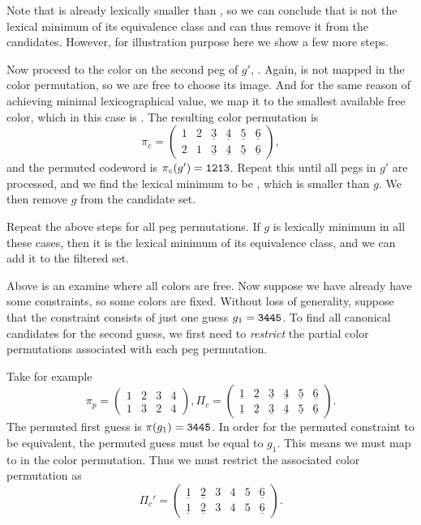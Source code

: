 Note that  is already lexically smaller than , so we can conclude that  is not the lexical minimum of its equivalence class and can thus remove it from the candidates. However, for illustration purpose here we show a few more steps.

Now proceed to the color on the second peg of $g'$, . Again,  is not mapped in the color permutation, so we are free to choose its image. And for the same reason of achieving minimal lexicographical value, we map it to the smallest available free color, which in this case is . The resulting color permutation is
\[
\pi_c = 
\begin{pmatrix}
1 & 2 & \underline{3} & \underline{4} & \underline{5} & \underline{6} \\
2 & 1 & \underline{3} & \underline{4} & \underline{5} & \underline{6} 
\end{pmatrix} ,
\]
and the permuted codeword is $\pi_c(g') = \texttt{1213}$. Repeat this until all pegs in $g'$ are processed, and we find the lexical minimum to be , which is smaller than $g$. We then remove $g$ from the candidate set. 

Repeat the above steps for all peg permutations. If $g$ is lexically minimum in all these cases, then it is the lexical minimum of its equivalence class, and we can add it to the filtered set.

Above is an examine where all colors are free. Now suppose we have already have some constraints, so some colors are fixed. Without loss of generality, suppose that the constraint consists of just one guess $g_1 = \texttt{3445}$. To find all canonical candidates for the second guess, we first need to \emph{restrict} the partial color permutations associated with each peg permutation. 

Take for example 
\[
\pi_p = 
\begin{pmatrix}
1 & 2 & 3 & 4 \\
1 & 3 & 2 & 4
\end{pmatrix} , 
\Pi_c = 
\begin{pmatrix}
\underline{1} & \underline{2} & \underline{3} & \underline{4} & \underline{5} & \underline{6} \\
\underline{1} & \underline{2} & \underline{3} & \underline{4} & \underline{5} & \underline{6} 
\end{pmatrix} .
\] 
The permuted first guess is $\pi(g_1) = \texttt{3445}$. In order for the permuted constraint to be equivalent, the permuted guess must be equal to $g_1$. This means we must map  to  in the color permutation. Thus we must restrict the associated color permutation as
\[
\Pi_c' = 
\begin{pmatrix}
\underline{1} & \underline{2} & 3 & 4 & 5 & \underline{6} \\
\underline{1} & \underline{2} & 3 & 4 & 5  & \underline{6} 
\end{pmatrix} .
\]

